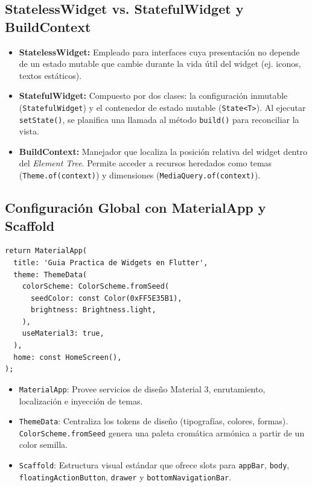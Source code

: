 \documentclass[12pt,a4paper]{article}
\begin{document}
\subsection{StatelessWidget vs. StatefulWidget y BuildContext}
\begin{itemize}[leftmargin=*]
    \item \textbf{StatelessWidget:} Empleado para interfaces cuya presentación no depende de un estado mutable que cambie durante la vida útil del widget (ej. iconos, textos estáticos).
    \item \textbf{StatefulWidget:} Compuesto por dos clases: la configuración inmutable (\texttt{StatefulWidget}) y el contenedor de estado mutable (\texttt{State<T>}). Al ejecutar \texttt{setState()}, se planifica una llamada al método \texttt{build()} para reconciliar la vista.
    \item \textbf{BuildContext:} Manejador que localiza la posición relativa del widget dentro del \textit{Element Tree}. Permite acceder a recursos heredados como temas (\texttt{Theme.of(context)}) y dimensiones (\texttt{MediaQuery.of(context)}).
\end{itemize}

\subsection{Configuración Global con MaterialApp y Scaffold}
\begin{lstlisting}[caption={Configuración global con MaterialApp y Scaffold},label={lst:materialapp}]
return MaterialApp(
  title: 'Guia Practica de Widgets en Flutter',
  theme: ThemeData(
    colorScheme: ColorScheme.fromSeed(
      seedColor: const Color(0xFF5E35B1),
      brightness: Brightness.light,
    ),
    useMaterial3: true,
  ),
  home: const HomeScreen(),
);
\end{lstlisting}

\begin{itemize}[leftmargin=*]
    \item \texttt{MaterialApp}: Provee servicios de diseño Material 3, enrutamiento, localización e inyección de temas.
    \item \texttt{ThemeData}: Centraliza los tokens de diseño (tipografías, colores, formas). \texttt{ColorScheme.fromSeed} genera una paleta cromática armónica a partir de un color semilla.
    \item \texttt{Scaffold}: Estructura visual estándar que ofrece slots para \texttt{appBar}, \texttt{body}, \texttt{floatingActionButton}, \texttt{drawer} y \texttt{bottomNavigationBar}.
\end{itemize}
\end{document}
